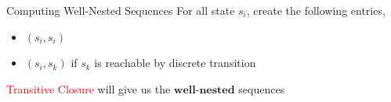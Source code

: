 \documentclass{beamer}
\begin{document}
  \begin{frame}{Computing Well-Nested Sequences}
      For all state $s_i$, create the following entries,
      \begin{itemize}
      \item $(s_i,s_i)$ 
        \item $(s_i,s_k)$ if $s_k$ is reachable by
          discrete transition
        \end{itemize}

        \pause
        \begin{center}  
 \scalebox{0.8}{ %
    \begin{tabular}{ c|c|c|c|c c }
        $\ddots$ & $s_j$ & $\dots$ &$s_k$& $\dots$&
                                                    \rdelim\}{4}{0cm}[$\mid
                                                    \mathcal{S}\mid$]
      \tabularnewline
        \hline
        $\vdots$ & $\vdots$ & $\dots$ &$\vdots$ &$\dots$\tabularnewline
        \hline                     
        $s_i$ & $1$ & $\dots$& $0$ & $\dots$\tabularnewline
        \hline
        $\vdots$ &  $\vdots$&$\dots$ &$\vdots$ &$\ddots$ \tabularnewline
      \end{tabular}
    }
    \end{center}
       
           
 
                                                       
           
           
        

\pause


        \textcolor{red}{Transitive Closure} will give us the
        $\textbf{well-nested}$ sequences
        
      \end{frame}
\end{document}
